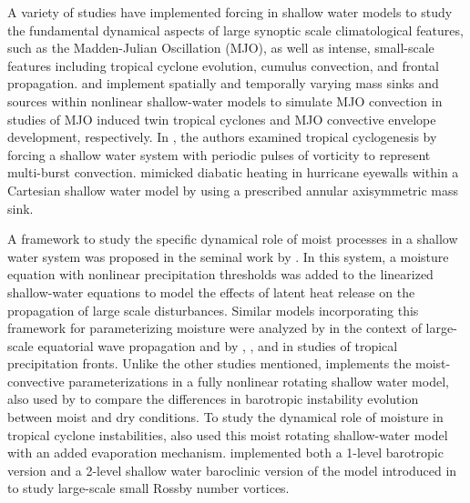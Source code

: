\documentclass{ametsoc}
\begin{document}
A variety of studies have implemented forcing in shallow water models to study
 the fundamental dynamical aspects of large synoptic
scale climatological features, such as the Madden-Julian Oscillation (MJO),
as well as intense, small-scale features including tropical cyclone 
evolution, cumulus convection, and frontal propagation.
\cite{ferreira1996dynamical} and \cite{yang2013triggered} implement
spatially and temporally varying mass sinks and sources within nonlinear 
shallow-water models to simulate MJO convection in studies of MJO
induced twin tropical cyclones and MJO convective envelope 
development, respectively. In \cite{enagonio2001tropical}, 
the authors examined tropical cyclogenesis
by forcing a shallow water system with periodic pulses of vorticity to represent multi-burst convection.
 \cite{hendricks2014hurricane} mimicked diabatic heating in hurricane 
eyewalls within a Cartesian shallow water model by using a prescribed annular
 axisymmetric mass sink.

A framework to study the specific dynamical role of moist processes in a shallow water system
was proposed in the seminal work by \cite{gill1982studies}. In this system,
 a moisture equation with nonlinear precipitation thresholds was added to the 
linearized shallow-water equations to model the effects of latent heat release on the 
propagation of large scale disturbances. Similar models incorporating this framework for 
parameterizing moisture were analyzed by \cite{goswami1991modification} in the context of
large-scale equatorial wave propagation and by \cite{frierson2004large},
\cite{stechmann2006structure}, and \cite{bouchut2009fronts} in studies of tropical precipitation 
fronts. Unlike the other studies mentioned, \cite{bouchut2009fronts} implements the moist-convective 
parameterizations in a fully nonlinear rotating shallow water model,
also used by \cite{lambaerts2011moist} to compare the differences in barotropic instability evolution between moist and dry conditions. To study the
dynamical role of moisture in tropical cyclone instabilities, \cite{lahaye2016understanding} 
also used this moist rotating shallow-water model with an added evaporation 
mechanism. \cite{rostami2017influence} implemented both a 1-level barotropic 
version and a 2-level shallow water baroclinic version of the model introduced in 
\cite{lambaerts2011moist} to study large-scale small Rossby number vortices.
\end{document}
